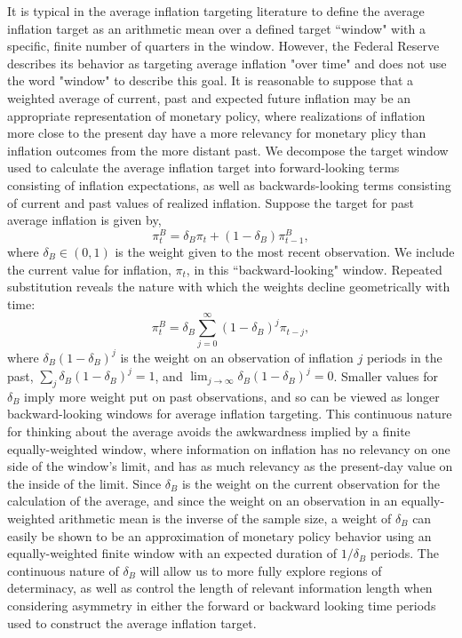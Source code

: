 \documentclass[english,authoryear,12pt]{elsarticle}
\begin{document}
It is typical in the average inflation targeting literature to define the average inflation target as an arithmetic mean over a defined target ``window" with a specific, finite number of quarters in the window. However, the Federal Reserve describes its behavior as targeting average inflation "over time" and does not use the word "window" to describe this goal. It is reasonable to suppose that a weighted average of current, past and expected future inflation may be an appropriate representation of monetary policy, where realizations of inflation more close to the present day have a more relevancy for monetary plicy than inflation outcomes from the more distant past. We decompose the target window used to calculate the average inflation target into forward-looking terms consisting of inflation expectations, as well as backwards-looking terms consisting of current and past values of realized inflation. Suppose the target for past average inflation is given by,
\begin{equation}\label{eq:backward}
	\pi_t^B = \delta_B \pi_t + (1-\delta_B) \pi_{t-1}^B,
\end{equation}
where $\delta_B \in (0,1)$ is the weight given to the most recent observation. We include the current value for inflation, $\pi_t$, in this ``backward-looking" window.  Repeated substitution reveals the nature with which the weights decline geometrically with time:
\begin{equation}\label{eq:backward_all}
	\pi_t^B = \delta_B \sum_{j=0}^{\infty} (1-\delta_B)^j \pi_{t-j},
\end{equation}
where $\delta_B (1-\delta_B)^j$ is the weight on an observation of inflation $j$ periods in the past, $\sum_j \delta_B (1-\delta_B)^j=1$, and $\lim_{j \to \infty} \delta_B (1-\delta_B)^j=0$. Smaller values for $\delta_B$ imply more weight put on past observations, and so can be viewed as longer backward-looking windows for average inflation targeting. This continuous nature for thinking about the average avoids the awkwardness implied by a finite equally-weighted window, where information on inflation has no relevancy on one side of the window's limit, and has as much relevancy as the present-day value on the inside of the limit. Since $\delta_B$ is the weight on the current observation for the calculation of the average, and since the weight on an observation in an equally-weighted arithmetic mean is the inverse of the sample size, a weight of $\delta_B$ can easily be shown to be an approximation of monetary policy behavior using an equally-weighted finite window with an expected duration of $1 / \delta_B$ periods. The continuous nature of $\delta_B$ will allow us to more fully explore regions of determinacy, as well as control the length of relevant information length when considering asymmetry in either the forward or backward looking time periods used to construct the average inflation target.
\end{document}
